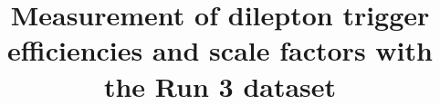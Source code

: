 \providecommand{\ObsOne}{\ensuremath{\mathcal{O}_{1}}\xspace}
\providecommand{\ObsThree}{\ensuremath{\mathcal{O}_{3}}\xspace}
\providecommand{\ObsInd}{\ensuremath{\mathcal{O}_{i}}\xspace}
\providecommand{\AsymI}{\ensuremath{\text{A}_{\mathcal{O}_{i}}}\xspace}
\providecommand{\AsymOne}{\ensuremath{\text{A}_{\mathcal{O}_{1}}}\xspace}
\providecommand{\AsymThree}{\ensuremath{\text{A}_{\mathcal{O}_{3}}}\xspace}

\providecommand{\dtG}{\ensuremath{d_{\PQt G}}\xspace}
\providecommand{\ImdtG}{\ensuremath{\text{Im}(\dtG)}\xspace}
\providecommand{\Lag}{\ensuremath{\mathcal{L}}\xspace}
\providecommand{\gS}{\ensuremath{g_{\mathrm{S}}}\xspace}
\providecommand{\GMM}{\ensuremath{T^a}\xspace}
\providecommand{\FST}{\ensuremath{G_{\mu\nu}}\xspace}
\providecommand{\CMDM}{\ensuremath{a^{\Pg}_{\PQt}}\xspace}

\providecommand{\PQt}{\text{t}\xspace}
\providecommand{\PAQt}{\bar{\text{t}}\xspace}
\providecommand{\PQb}{\text{b}\xspace}
\providecommand{\PAQb}{\bar{\text{b}}\xspace}
\providecommand{\Pellp}{\ell^{+}\xspace}
\providecommand{\Pellm}{\ell^{-}\xspace}
\providecommand{\Pellpm}{\ell^{\pm}\xspace}

\providecommand{\momt}{\ensuremath{p_{\PQt}}\xspace}
\providecommand{\momat}{\ensuremath{p_{\PAQt}}\xspace}
\providecommand{\momb}{\ensuremath{p_{\PQb}}\xspace}
\providecommand{\momab}{\ensuremath{p_{\PAQb}}\xspace}
\providecommand{\momlp}{\ensuremath{p_{\Pellp}}\xspace}
\providecommand{\momlm}{\ensuremath{p_{\Pellm}}\xspace}

\providecommand{\TeV}{\,\text{TeV}\xspace}
\providecommand{\fbinv}{\,\text{fb}^{-1}\xspace}
\providecommand{\trigSF}{\ensuremath{\mathrm{SF}_{\mathrm{trig}}}\xspace}




\newcommand{\todo}[1]{\textbf{[TO VERIFY: #1]}}
\newcommand{\insertitem}[1]{\textbf{[TO INSERT: #1]}}
\newcommand{\plotplaceholder}[1]{\fbox{\begin{minipage}[c][3.2cm][c]{0.83\linewidth}\centering\small\textbf{Result plot pending}\\#1\end{minipage}}}

\title{Measurement of dilepton trigger efficiencies and scale factors with the Run 3 dataset}

